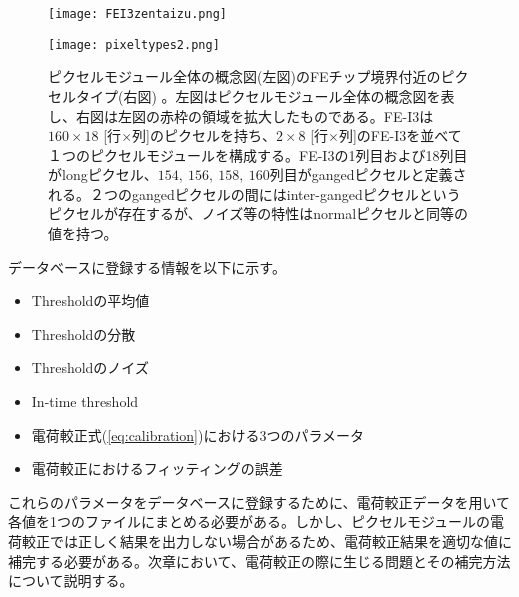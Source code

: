 \begin{figure}[tbp]
  \begin{minipage}[1]{0.5\linewidth}
    \centering
    \texttt{[image: FEI3zentaizu.png]}
  \end{minipage}
  \begin{minipage}[1]{0.5\linewidth}
    \centering
    \texttt{[image: pixeltypes2.png]}
  \end{minipage}
  \caption[ピクセルモジュール全体図とFEチップ境界付近のピクセルタイプ]{ピクセルモジュール全体の概念図(左図)のFEチップ境界付近のピクセルタイプ(右図) \cite{pixeltypes}。左図はピクセルモジュール全体の概念図を表し、右図は左図の赤枠の領域を拡大したものである。FE-I3は$160\times18$ [行$\times$列]のピクセルを持ち、$2\times8$ [行$\times$列]のFE-I3を並べて１つのピクセルモジュールを構成する。FE-I3の1列目および18列目がlongピクセル、$154,\ 156,\ 158,\ 160$列目がgangedピクセルと定義される。２つのgangedピクセルの間にはinter-gangedピクセルというピクセルが存在するが、ノイズ等の特性はnormalピクセルと同等の値を持つ。}
  \label{fig:pixeltypes}
\end{figure}


データベースに登録する情報を以下に示す。
\begin{itemize}
  \item Thresholdの平均値
  \item Thresholdの分散
  \item Thresholdのノイズ
  \item In-time threshold
  \item 電荷較正式(\ref{eq:calibration})における3つのパラメータ
  \item 電荷較正におけるフィッティングの誤差
\end{itemize}

これらのパラメータをデータベースに登録するために、電荷較正データを用いて各値を1つのファイルにまとめる必要がある。しかし、ピクセルモジュールの電荷較正では正しく結果を出力しない場合があるため、電荷較正結果を適切な値に補完する必要がある。次章において、電荷較正の際に生じる問題とその補完方法について説明する。



\newpage
